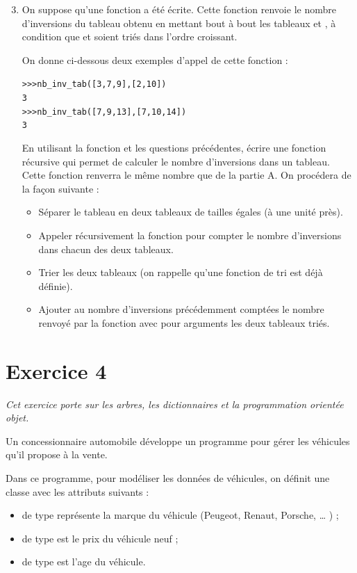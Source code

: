 \documentclass[11pt,a4paper,french,twoside]{PMCours}
\begin{document}
\begin{enumerate}\setcounter{enumi}{2}
\item On suppose qu'une fonction  a été écrite. Cette fonction
renvoie le nombre d'inversions du tableau obtenu en mettant bout à bout les tableaux
 et , à condition que  et  soient triés dans l'ordre croissant.

On donne ci-dessous deux exemples d'appel de cette fonction :
\begin{alltt}
>>> nb\_inv\_tab([3, 7, 9], [2, 10])
3
>>> nb\_inv\_tab([7, 9, 13], [7, 10, 14])
3
\end{alltt}
En utilisant la fonction  et les questions précédentes, écrire une fonction
récursive  qui permet de calculer le nombre d'inversions
dans un tableau. Cette fonction renverra le même nombre que
 de la partie A. On procédera de la façon suivante :
\begin{itemize}
\item Séparer le tableau en deux tableaux de tailles égales (à une unité près).
\item Appeler récursivement la fonction  pour compter le nombre
d'inversions dans chacun des deux tableaux.
\item Trier les deux tableaux (on rappelle qu'une fonction de tri est déjà définie).
\item Ajouter au nombre d'inversions précédemment comptées le nombre renvoyé par la
fonction  avec pour arguments les deux tableaux triés.
\end{itemize}
\end{enumerate}

\newpage
\section*{Exercice 4}

\emph{Cet exercice porte sur les arbres, les dictionnaires et la programmation orientée objet.}

\medskip
Un concessionnaire automobile développe un programme pour gérer les véhicules qu'il
propose à la vente.

Dans ce programme, pour modéliser les données de véhicules, on définit une classe
 avec les attributs suivants :
\begin{itemize}
\item {} de type  représente la marque du véhicule (Peugeot, Renaut, Porsche, … ) ;
\item {} de type  est le prix du véhicule neuf ;
\item {} de type  est l'age du véhicule.
\end{itemize}
\end{document}
